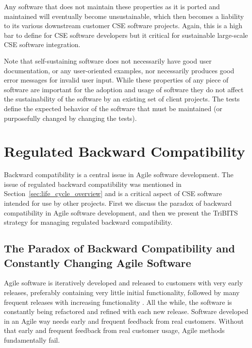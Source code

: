 \documentclass[11pt]{SANDreport}
\begin{document}
Any software that does not maintain these properties as it is ported and maintained will eventually become unsustainable, which then becomes a liability to its various downstream customer CSE software projects.  Again, this is a high bar to define for CSE software developers but it critical for sustainable large-scale CSE software integration.

Note that self-sustaining software does not necessarily have good user documentation, or any user-oriented examples, nor necessarily produces good error messages for invalid user input.  While these properties of any piece of software are important for the adoption and usage of software they do not affect the sustainability of the software by an existing set of client projects.  The tests define the expected behavior of the software that must be maintained (or purposefully changed by changing the tests).


%
{}\section{Regulated Backward Compatibility}
\label{sec:regulated_backard_compatibility}
%

Backward compatibility is a central issue in Agile software development.  The issue of regulated backward compatibility was mentioned in Section~\ref{sec:life_cycle_overview} and is a critical aspect of CSE software intended for use by other projects.  First we discuss the paradox of backward compatibility in Agile software development, and then we present the  TriBITS strategy for managing regulated backward compatibility.


%
{}\subsection{The Paradox of Backward Compatibility and Constantly
Changing Agile Software}
\label{sec:paradox_of_back_compat_agile}
%

Agile software is iteratively developed and released to customers with very early releases, preferably containing very little initial functionality, followed by many frequent releases with increasing functionality {}\cite{AgileSoftwareDevelopment}.  All the while, the software is constantly being refactored and refined with each new release.  Software developed in an Agile way needs early and frequent feedback from real customers.  Without that early and frequent feedback from real customer usage, Agile methods fundamentally fail.
\end{document}
